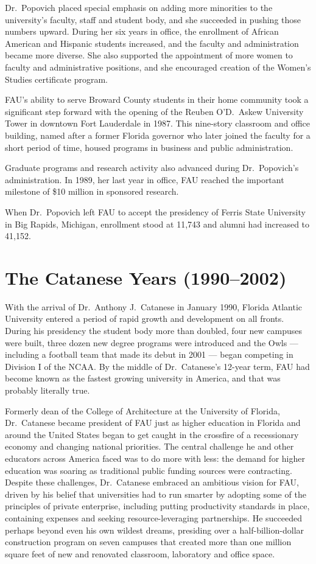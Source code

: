\documentclass{article}
\begin{document}
Dr.\ Popovich placed special emphasis on adding more minorities to the university's faculty, staff and student body, and she succeeded in pushing those numbers upward. During her six years in office, the enrollment of African American and Hispanic students increased, and the faculty and administration became more diverse. She also supported the appointment of more women to faculty and administrative positions, and she encouraged creation of the Women's Studies certificate program.

FAU's ability to serve Broward County students in their home community took a significant step forward with the opening of the Reuben O'D.\ Askew University Tower in downtown Fort Lauderdale in 1987.  This nine-story classroom and office building, named after a former Florida governor who later joined the faculty for a short period of time, housed programs in business and public administration.

Graduate programs and research activity also advanced during Dr.\ Popovich's administration.  In 1989, her last year in office, FAU reached the important milestone of \$10 million in sponsored research.

When Dr.\ Popovich left FAU to accept the presidency of Ferris State University in Big Rapids, Michigan, enrollment stood at 11,743 and alumni had increased to 41,152.

\section{The Catanese Years (1990--2002)}

With the arrival of Dr.\ Anthony J.\ Catanese in January 1990, Florida Atlantic University entered a period of rapid growth and development on all fronts.  During his presidency the student body more than doubled, four new campuses were built, three dozen new degree programs were introduced and the Owls  ---  including a football team that made its debut in 2001  ---  began competing in Division I of the NCAA.  By the middle of Dr.\ Catanese's 12-year term, FAU had become known as the fastest growing university in America, and that was probably literally true.

Formerly dean of the College of Architecture at the University of Florida, Dr.\ Catanese became president of FAU just as higher education in Florida and around the United States began to get caught in the crossfire of a recessionary economy and changing national priorities.  The central challenge he and other educators across America faced was to do more with less: the demand for higher education was soaring as traditional public funding sources were contracting.  Despite these challenges, Dr.\ Catanese embraced an ambitious vision for FAU, driven by his belief that universities had to  run smarter  by adopting some of the principles of private enterprise, including putting productivity standards in place, containing expenses and seeking resource-leveraging partnerships.  He succeeded perhaps beyond even his own wildest dreams, presiding over a half-billion-dollar construction program on seven campuses that created more than one million square feet of new and renovated classroom, laboratory and office space.
\end{document}
